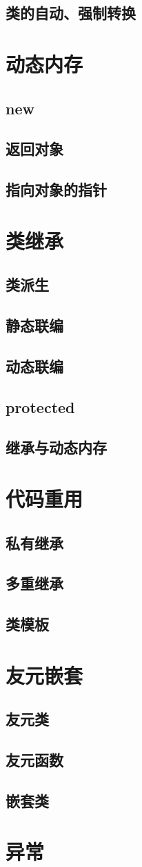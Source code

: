 \documentclass[UTF8,a4paper,12pt,onecolumn,twoside]{article}
\begin{document}
\subsection{类的自动、强制转换}
\newpage
\section{动态内存}
\subsection{new}
\subsection{返回对象}
\subsection{指向对象的指针}
\newpage
\section{类继承}
\subsection{类派生}
\subsection{静态联编}
\subsection{动态联编}
\subsection{protected}
\subsection{继承与动态内存}
\newpage
\section{代码重用}
\subsection{私有继承}
\subsection{多重继承}
\subsection{类模板}
\newpage
\section{友元嵌套}
\subsection{友元类}
\subsection{友元函数}
\subsection{嵌套类}
\newpage
\section{异常}
\end{document}
